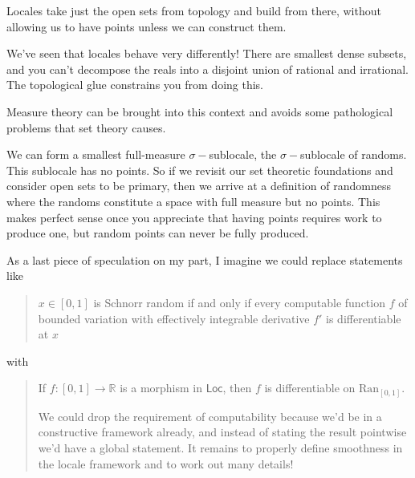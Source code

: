 \documentclass[12pt]{extarticle}
\newcommand{\Locale}{\ensuremath{\mathsf{Loc}}}
\newcommand{\ran}{\ensuremath{\mathrm{Ran}}}
\newcommand{\sig}{\ensuremath{\sigma-}}
\begin{document}
Locales take just the open sets from topology and build from there, without allowing us to have points unless we can construct them.

We've seen that locales behave very differently! There are smallest dense subsets, and you can't decompose the reals into a disjoint union of rational and irrational. The topological glue constrains you from doing this.

Measure theory can be brought into this context and avoids some pathological problems that set theory causes.

We can form a smallest full-measure \sig sublocale, the \sig sublocale of randoms. This sublocale has no points. So if we revisit our set theoretic foundations and consider open sets to be primary, then we arrive at a definition of randomness where the randoms constitute a space with full measure but no points. This makes perfect sense once you appreciate that having points requires work to produce one, but random points can never be fully produced.

As a last piece of speculation on my part, I imagine we could replace statements like 
\begin{quote}
$x\in [0,1]$ is Schnorr random if and only if every computable function $f$ of bounded variation with effectively integrable derivative $f'$ is differentiable at $x$
\end{quote}
with 
\begin{quote}
If $f:[0,1]\to\mathbb{R}$ is a morphism in \Locale, then $f$ is differentiable on $\ran_{[0,1]}$.

We could drop the requirement of computability because we'd be in a constructive framework already, and instead of stating the result pointwise we'd have a global statement. It remains to properly define smoothness in the locale framework and to work out many details!
\end{quote}
\end{document}
